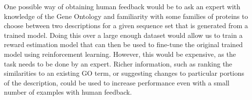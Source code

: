 \documentclass{specification}
\begin{document}
One possible way of obtaining human feedback would be to ask an expert with knowledge of the Gene Ontology and familiarity with some families of proteins to choose between two descriptions for a given sequence set that is generated from a trained model.
Doing this over a large enough dataset would allow us to train a reward estimation model that can then be used to fine-tune the original trained model using reinforcement learning.
However, this would be expensive, as the task needs to be done by an expert.
Richer information, such as ranking the similarities to an existing GO term, or suggesting changes to particular portions of the description, could be used to increase performance even with a small number of examples with human feedback.

\printbibliography
\end{document}
